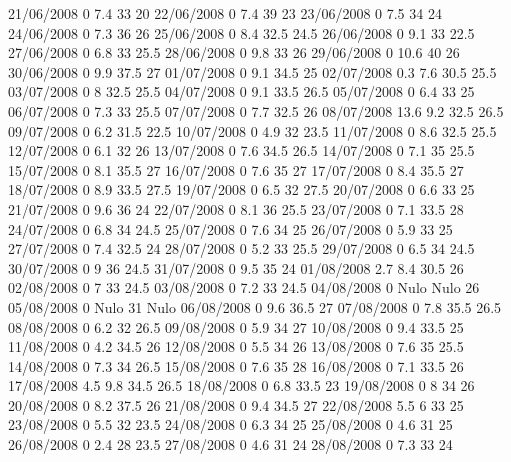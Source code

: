 21/06/2008  0      7.4    33     20 
22/06/2008  0      7.4    39     23 
23/06/2008  0      7.5    34     24 
24/06/2008  0      7.3    36     26 
25/06/2008  0      8.4    32.5   24.5 
26/06/2008  0      9.1    33     22.5 
27/06/2008  0      6.8    33     25.5 
28/06/2008  0      9.8    33     26 
29/06/2008  0      10.6   40     26 
30/06/2008  0      9.9    37.5   27 
01/07/2008  0      9.1    34.5   25 
02/07/2008  0.3    7.6    30.5   25.5 
03/07/2008  0      8      32.5   25.5 
04/07/2008  0      9.1    33.5   26.5 
05/07/2008  0      6.4    33     25 
06/07/2008  0      7.3    33     25.5 
07/07/2008  0      7.7    32.5   26 
08/07/2008  13.6   9.2    32.5   26.5 
09/07/2008  0      6.2    31.5   22.5 
10/07/2008  0      4.9    32     23.5 
11/07/2008  0      8.6    32.5   25.5 
12/07/2008  0      6.1    32     26 
13/07/2008  0      7.6    34.5   26.5 
14/07/2008  0      7.1    35     25.5 
15/07/2008  0      8.1    35.5   27 
16/07/2008  0      7.6    35     27 
17/07/2008  0      8.4    35.5   27 
18/07/2008  0      8.9    33.5   27.5 
19/07/2008  0      6.5    32     27.5 
20/07/2008  0      6.6    33     25 
21/07/2008  0      9.6    36     24 
22/07/2008  0      8.1    36     25.5 
23/07/2008  0      7.1    33.5   28 
24/07/2008  0      6.8    34     24.5 
25/07/2008  0      7.6    34     25 
26/07/2008  0      5.9    33     25 
27/07/2008  0      7.4    32.5   24 
28/07/2008  0      5.2    33     25.5 
29/07/2008  0      6.5    34     24.5 
30/07/2008  0      9      36     24.5 
31/07/2008  0      9.5    35     24 
01/08/2008  2.7    8.4    30.5   26 
02/08/2008  0      7      33     24.5 
03/08/2008  0      7.2    33     24.5 
04/08/2008  0     Nulo   Nulo    26 
05/08/2008  0     Nulo    31    Nulo
06/08/2008  0      9.6    36.5   27 
07/08/2008  0      7.8    35.5   26.5 
08/08/2008  0      6.2    32     26.5 
09/08/2008  0      5.9    34     27 
10/08/2008  0      9.4    33.5   25 
11/08/2008  0      4.2    34.5   26 
12/08/2008  0      5.5    34     26 
13/08/2008  0      7.6    35     25.5 
14/08/2008  0      7.3    34     26.5 
15/08/2008  0      7.6    35     28 
16/08/2008  0      7.1    33.5   26 
17/08/2008  4.5    9.8    34.5   26.5 
18/08/2008  0      6.8    33.5   23 
19/08/2008  0      8      34     26 
20/08/2008  0      8.2    37.5   26 
21/08/2008  0      9.4    34.5   27 
22/08/2008  5.5    6      33     25 
23/08/2008  0      5.5    32     23.5 
24/08/2008  0      6.3    34     25 
25/08/2008  0      4.6    31     25 
26/08/2008  0      2.4    28     23.5 
27/08/2008  0      4.6    31     24 
28/08/2008  0      7.3    33     24 
